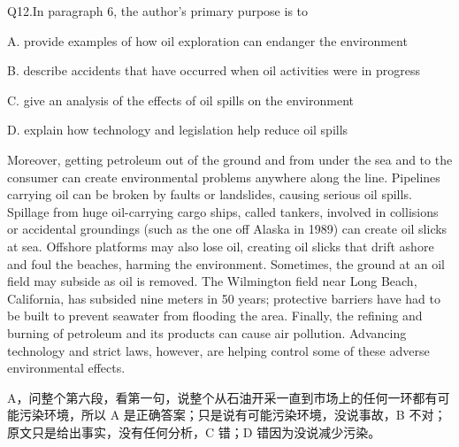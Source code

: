 \begin{blk}
    \begin{qst}
        Q12.In paragraph 6, the author’s primary purpose is to
    \end{qst}

    \begin{chc}
        A. provide examples of how oil exploration can endanger the environment

        B. describe accidents that have occurred when oil activities were in progress

        C. give an analysis of the effects of oil spills on the environment

        D. explain how technology and legislation help reduce oil spills
    \end{chc}

    \begin{psgq}
        Moreover, getting petroleum out of the ground and from under the sea and to the consumer can create environmental problems anywhere along the line. Pipelines carrying oil can be broken by faults or landslides, causing serious oil spills. Spillage from huge oil-carrying cargo ships, called tankers, involved in collisions or accidental groundings (such as the one off Alaska in 1989) can create oil slicks at sea. Offshore platforms may also lose oil, creating oil slicks that drift ashore and foul the beaches, harming the environment. Sometimes, the ground at an oil field may subside as oil is removed. The Wilmington field near Long Beach, California, has subsided nine meters in 50 years; protective barriers have had to be built to prevent seawater from flooding the area. Finally, the refining and burning of petroleum and its products can cause air pollution. Advancing technology and strict laws, however, are helping control some of these adverse environmental effects.
    \end{psgq}

    \begin{nlz}
        A，问整个第六段，看第一句，说整个从石油开采一直到市场上的任何一环都有可能污染环境，所以 A 是正确答案；只是说有可能污染环境，没说事故，B 不对；原文只是给出事实，没有任何分析，C 错；D 错因为没说减少污染。
    \end{nlz}
\end{blk}

